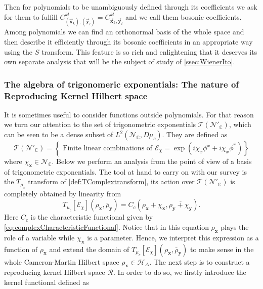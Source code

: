 \documentclass[12pt]{article}%
\begin{document}
 Then for polynomials to be unambiguously defined through its coefficients we ask for them to fulfill $C^{kl}_{(\vec{\mathbf{x}}_k),(\vec{\mathbf{y}}_l)}=C^{kl}_{\vec{\mathbf{x}}_k,\vec{\mathbf{y}}_l}$ and we call them bosonic coefficients. Among polynomials we can find an orthonormal basis of the whole space and then describe it efficiently through its bosonic coefficients in an appropriate way using the $S$ transform. This feature is so rich and enlightening that it deserves its own separate analysis that will be the subject of study of \autoref{ssec:WienerIto}. 
 
\subsubsection{ The algebra of trigonomeric exponentials: The nature of Reproducing Kernel Hilbert space}

 It is sometimes useful to consider functions outside polynomials. For that reason we turn our attention to the set of trigonometric exponentials $\mathcal{T}(\mathcal{N}'_\mathbb{C})$, which can be seen  to be a dense subset of $L^2(\mathcal{N}_\mathbb{C}, D\mu_c)$. They are defined as   
\begin{equation}
\label{eq:trigExponentials}
\mathcal{T}(\mathcal{N}'_\mathbb{C})=\left\{\textrm{ Finite linear combinations of }  \mathcal{E}_{\chi}=\exp\left(i\bar\chi_x\phi^x+i\chi_x\bar\phi^x\right)\right\}
\end{equation}
where $\chi_{\mathbf{x}}\in \mathcal{N}_{\mathbb{C}}$. Below we perform an analysis from the point of view of a basis of trigonometric exponentials. The tool at hand  to carry on with our survey is the $T_{\mu_c}$ transform of \autoref{def:TComplextransform}, its action over $\mathcal{T}(\mathcal{N}'_\mathbb{C})$ is completely obtained by linearity from  
\begin{equation}
\label{eq:TtransformTrig}
T_{\mu_c}[\mathcal{E}_{\chi}](\rho_\mathbf{x},\bar{\rho}_\mathbf{y})=C_c(\rho_{\mathbf{x}}+\chi_{\mathbf{x}},\overline{\rho_{\mathbf{y}}+\chi_{\mathbf{y}}}).
\end{equation}
Here $C_c$ is the characteristic functional given by \eqref{eq:complexCharacteristicFunctional}. Notice that in this equation $\rho_\mathbf{x}$ plays the role of a variable while $\chi_\mathbf{x}$ is a parameter. Hence, we interpret this expression as a function of $\rho_\mathbf{x}$ and extend the domain of  $T_{\mu_c}[\mathcal{E}_{\chi}](\rho_\mathbf{x},\bar{\rho}_\mathbf{y})$ to make sense in the whole Cameron-Martin Hilbert space  $\rho_{\mathbf{x}}\in \mathcal{H}_\Delta$. The next step is to construct a reproducing kernel Hilbert space $\mathcal{R}$. In order to do so, we firstly introduce the kernel functional defined as
\end{document}
